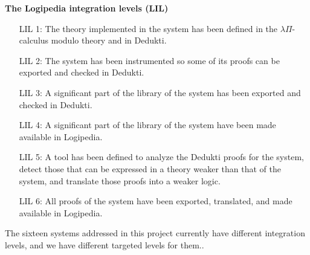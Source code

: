 \begin{framed}
\begin{center}
{\bf The {\sf Logipedia} integration levels (LIL)\label{lil}}
\end{center}

\begin{itemize}
\item[LIL 1:]
The theory implemented in the system has been defined in
the $\lambda\Pi$-calculus modulo theory and in {\sf Dedukti}.

\item[LIL 2:]
The system has been instrumented so some of its proofs can be exported
and checked in {\sf Dedukti}.

\item[LIL 3:] A significant part of the library of the system has been
  exported and checked in {\sf Dedukti}.

\item[LIL 4:] A significant part of the library of the system have
  been made available in {\sf Logipedia}.

\item[LIL 5:]
A tool has been defined to analyze the {\sf Dedukti} proofs for the system,
detect those that can be expressed in a theory weaker than that of the
system, and translate those proofs into a weaker logic.

\item[LIL 6:]
All proofs of the system have been exported, translated,
and made available in {\sf Logipedia}.
\end{itemize}
\end{framed}

The sixteen systems addressed in this project currently have different
integration levels, and we have different targeted levels for them.. 

